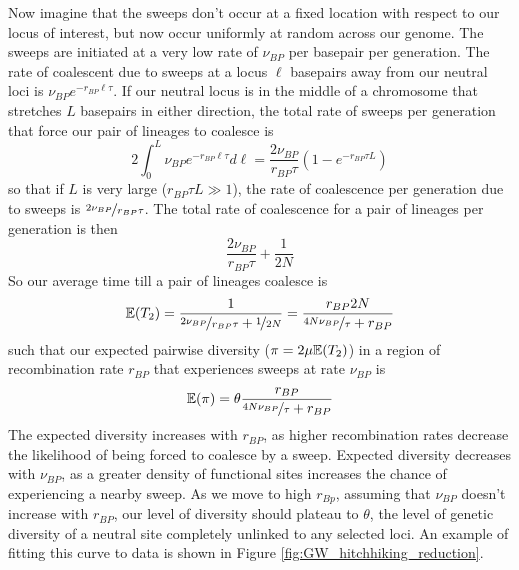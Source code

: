 Now imagine that the sweeps don't occur at a fixed location with
respect to our locus of interest, but now occur uniformly at random
across our genome. The sweeps are initiated at a very low rate of
$\nu_{BP}$ per basepair per generation. The rate of coalescent due to
sweeps at a locus $\ell$ basepairs away from our neutral loci is
$\nu_{BP} e^{-r_{BP} \ell \tau}$. If our neutral locus is in the
middle of a chromosome that stretches $L$ basepairs in either direction,
the total rate of sweeps per generation that force our pair of lineages to coalesce is
\begin{equation}
2\int_0^{L} \nu_{BP} e^{-r_{BP} \ell \tau} d \ell =
\frac{2\nu_{BP}}{r_{BP} \tau} \left(1-e^{-r_{BP} \tau L} \right)
\end{equation}
so that if $L$ is very large ($r_{BP} \tau L \gg 1$), the rate of coalescence per
generation due to sweeps is $\nicefrac{2\nu_{BP}}{r_{BP} \tau}$. The total rate
of coalescence for a pair of lineages per generation is then
\begin{equation}
\frac{2\nu_{BP}}{r_{BP} \tau}+\frac{1}{2N}
\end{equation}
So our average time till a pair of lineages coalesce is
\begin{equation}
\mathbb{E}(T_2) = \frac{1}{\nicefrac{2\nu_{BP}}{r_{BP} \tau}+\nicefrac{1}{2N}} = \frac{r_{BP}2N}{\nicefrac{4N\nu_{BP}}{ \tau}+r_{BP}}
\end{equation}
such that our expected pairwise diversity ($\pi=2\mu\mathbb{E}(T_2)$) in a region of
recombination rate $r_{BP}$ that experiences sweeps at rate $\nu_{BP}$
is  
\begin{equation}
\mathbb{E}(\pi) = \theta \frac{r_{BP}}{\nicefrac{4N\nu_{BP}}{ \tau}+r_{BP}} \label{eqn:pi_GW_HH}
\end{equation}
The expected diversity increases with $r_{BP}$, as higher recombination rates decrease the likelihood of being forced to coalesce by a sweep. Expected diversity decreases with $\nu_{BP}$, as a greater density of functional sites increases the chance of experiencing a nearby sweep. As we move to high $r_{Bp}$, assuming that $\nu_{BP}$ doesn't increase with $r_{BP}$, our level of diversity should plateau to $\theta$, the level of genetic diversity of a neutral site completely unlinked to any selected loci. An example of fitting this curve to data is shown in Figure \ref{fig:GW_hitchhiking_reduction}. 

